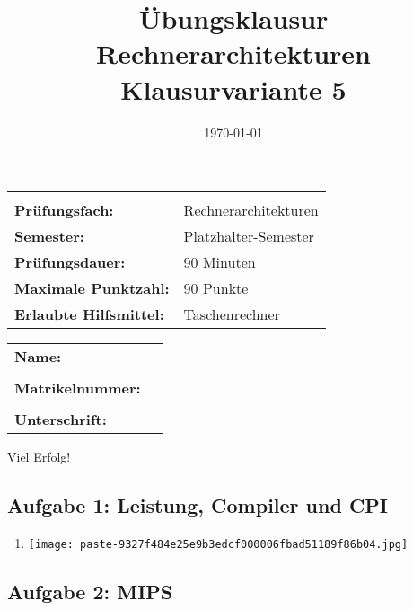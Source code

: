 \documentclass[12pt,a4paper]{article}
\title{Übungsklausur Rechnerarchitekturen \\ \large Klausurvariante 5}
\author{}
\date{\today}
\begin{document}
\begin{titlepage}
    \maketitle
    \vspace{0.5cm}
    \centering
    \begin{tabularx}{0.9\textwidth}{lX}
        \hline\hline \\
        \textbf{Prüfungsfach:} & Rechnerarchitekturen \\
        \textbf{Semester:} & Platzhalter-Semester \\
        \textbf{Prüfungsdauer:} & 90 Minuten \\
        \textbf{Maximale Punktzahl:} & 90 Punkte \\
        \textbf{Erlaubte Hilfsmittel:} & Taschenrechner \\
        \hline\hline
    \end{tabularx}
    \vspace{2.5cm}
    \begin{tabularx}{0.9\textwidth}{lX}
        \textbf{Name:} & \dotfill \\
        \\
        \textbf{Matrikelnummer:} & \dotfill \\
        \\
        \textbf{Unterschrift:} & \dotfill \\
    \end{tabularx}
    \vfill
    {\Large Viel Erfolg!}
\end{titlepage}
\clearpage
\subsection*{Aufgabe 1: Leistung, Compiler und CPI}

\begin{enumerate}[label=\alph*), topsep=5pt, itemsep=10pt]
\item \mbox{}\begin{center}\texttt{[image: paste-9327f484e25e9b3edcf000006fbad51189f86b04.jpg]}
\end{center}
\end{enumerate}
\clearpage
\subsection*{Aufgabe 2: MIPS}
\end{document}
